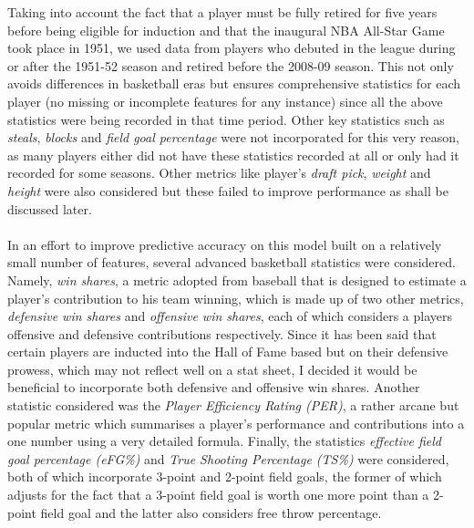 \documentclass[paper=a4, fontsize=11pt]{scrartcl} %
\numberwithin{equation}{section} %
\numberwithin{figure}{section} %
\numberwithin{table}{section} %
\begin{document}
Taking into account the fact that a player must be fully retired for five years before being eligible for induction\cite{hof_guidelines} and that the inaugural NBA All-Star Game took place in 1951, we used data from players who debuted in the league during or after the 1951-52 season and retired before the 2008-09 season. This not only avoids differences in basketball eras but ensures comprehensive statistics for each player (no missing or incomplete features for any instance) since all the above statistics were being recorded in that time period. Other key statistics such as \textit{steals}, \textit{blocks} and \textit{field goal percentage} were not incorporated for this very reason, as many players either did not have these statistics recorded at all or only had it recorded for some seasons. Other metrics like player's \textit{draft pick}, \textit{weight} and \textit{height} were also considered but these failed to improve performance as shall be discussed later.\\ %
\\
In an effort to improve predictive accuracy on this model built on a relatively small number of features, several advanced basketball statistics were considered. Namely, \textit{win shares}, a metric adopted from baseball that is designed to estimate a player's contribution to his team winning, which is made up of two other metrics, \textit{defensive win shares} and \textit{offensive win shares}, each of which considers a players offensive and defensive contributions respectively. Since it has been said that certain players are inducted into the Hall of Fame based but on their defensive prowess, which may not reflect well on a stat sheet, I decided it would be beneficial to incorporate both defensive and offensive win shares. Another statistic considered was the \textit{Player Efficiency Rating (PER)}, a rather arcane but popular metric which summarises a player's performance and contributions into a one number using a very detailed formula. Finally, the statistics \textit{effective field goal percentage (eFG\%)} and \textit{True Shooting Percentage (TS\%)} were considered, both of which incorporate 3-point and 2-point field goals, the former of which adjusts for the fact that a 3-point field goal is worth one more point than a 2-point field goal and the latter also considers free throw percentage.\\
\\
\end{document}
